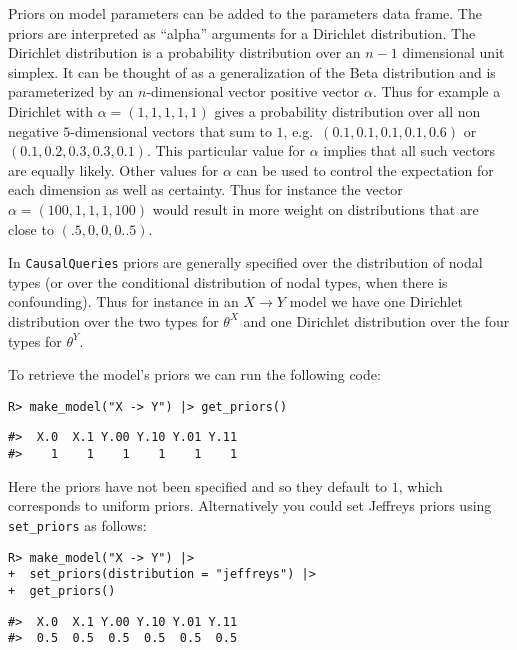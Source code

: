 \documentclass[
  11pt,
  article]{jss}
\begin{document}
Priors on model parameters can be added to the parameters data frame.
The priors are interpreted as ``alpha'' arguments for a Dirichlet
distribution. The Dirichlet distribution is a probability distribution
over an \(n-1\) dimensional unit simplex. It can be thought of as a
generalization of the Beta distribution and is parameterized by an
\(n\)-dimensional vector positive vector \(\alpha\). Thus for example a
Dirichlet with \(\alpha = (1, 1, 1, 1, 1)\) gives a probability
distribution over all non negative \(5\)-dimensional vectors that sum to
\(1\), e.g.~\((0.1, 0.1, 0.1, 0.1, 0.6)\) or
\((0.1, 0.2, 0.3, 0.3, 0.1)\). This particular value for \(\alpha\)
implies that all such vectors are equally likely. Other values for
\(\alpha\) can be used to control the expectation for each dimension as
well as certainty. Thus for instance the vector
\(\alpha = (100, 1, 1, 1, 100)\) would result in more weight on
distributions that are close to \((.5, 0, 0, 0. .5)\).

In \texttt{CausalQueries} priors are generally specified over the
distribution of nodal types (or over the conditional distribution of
nodal types, when there is confounding). Thus for instance in an
\(X \rightarrow Y\) model we have one Dirichlet distribution over the
two types for \(\theta^X\) and one Dirichlet distribution over the four
types for \(\theta^Y\).

To retrieve the model's priors we can run the following code:

\begin{verbatim}
R> make_model("X -> Y") |> get_priors()
\end{verbatim}

\begin{verbatim}
#>  X.0  X.1 Y.00 Y.10 Y.01 Y.11 
#>    1    1    1    1    1    1
\end{verbatim}

Here the priors have not been specified and so they default to \(1\),
which corresponds to uniform priors. Alternatively you could set
Jeffreys priors using \texttt{set\_priors} as follows:

\begin{verbatim}
R> make_model("X -> Y") |> 
+  set_priors(distribution = "jeffreys") |> 
+  get_priors()
\end{verbatim}

\begin{verbatim}
#>  X.0  X.1 Y.00 Y.10 Y.01 Y.11 
#>  0.5  0.5  0.5  0.5  0.5  0.5
\end{verbatim}
\end{document}
